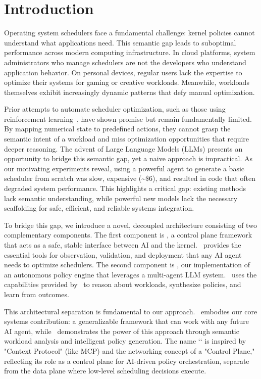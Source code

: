 \section{Introduction}
\label{sec:intro}

Operating system schedulers face a fundamental challenge: kernel policies cannot understand what applications need. This semantic gap leads to suboptimal performance across modern computing infrastructure. In cloud platforms, system administrators who manage schedulers are not the developers who understand application behavior. On personal devices, regular users lack the expertise to optimize their systems for gaming or creative workloads. Meanwhile, workloads themselves exhibit increasingly dynamic patterns that defy manual optimization.

Prior attempts to automate scheduler optimization, such as those using reinforcement learning~\cite{mao2019decima, qiu2020firm}, have shown promise but remain fundamentally limited. By mapping numerical state to predefined actions, they cannot grasp the semantic intent of a workload and miss optimization opportunities that require deeper reasoning. The advent of Large Language Models (LLMs) presents an opportunity to bridge this semantic gap, yet a naive approach is impractical. As our motivating experiments reveal, using a powerful agent to generate a basic scheduler from scratch was slow, expensive (\textasciitilde\$6), and resulted in code that often degraded system performance. This highlights a critical gap: existing methods lack semantic understanding, while powerful new models lack the necessary scaffolding for safe, efficient, and reliable systems integration.

To bridge this gap, we introduce a novel, decoupled architecture consisting of two complementary components. The first component is \sys, a control plane framework that acts as a safe, stable interface between AI and the kernel. \sys\ provides the essential tools for observation, validation, and deployment that any AI agent needs to optimize schedulers. The second component is \agent, our implementation of an autonomous policy engine that leverages a multi-agent LLM system. \agent\ uses the capabilities provided by \sys\ to reason about workloads, synthesize policies, and learn from outcomes.

This architectural separation is fundamental to our approach. \sys\ embodies our core systems contribution: a generalizable framework that can work with any future AI agent, while \agent\ demonstrates the power of this approach through semantic workload analysis and intelligent policy generation. The name `\sys` is inspired by "Context Protocol" (like MCP) and the networking concept of a "Control Plane," reflecting its role as a control plane for AI-driven policy orchestration, separate from the data plane where low-level scheduling decisions execute.


